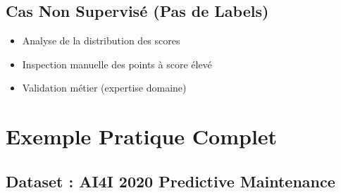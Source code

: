 \documentclass[a4paper,11pt]{article}
\begin{document}
\subsection{Cas Non Supervisé (Pas de Labels)}

\begin{itemize}
    \item Analyse de la distribution des scores
    \item Inspection manuelle des points à score élevé
    \item Validation métier (expertise domaine)
\end{itemize}

\section{Exemple Pratique Complet}

\subsection{Dataset : AI4I 2020 Predictive Maintenance}
\end{document}
